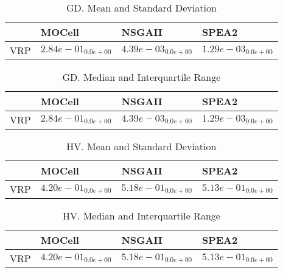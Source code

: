 \documentclass{article}
\begin{document}
\begin{table}
\caption{GD. Mean and Standard Deviation}
\label{table: GD}
\centering
\begin{scriptsize}
\begin{tabular}{llll}
\hline & MOCell & NSGAII &  SPEA2\\
\hline 
VRP & $  2.84e-01_{ 0.0e+00}$ & \cellcolor{gray25}$  4.39e-03_{ 0.0e+00}$ & \cellcolor{gray95}$  1.29e-03_{ 0.0e+00}$ \\
\hline
\end{tabular}
\end{scriptsize}
\end{table}

\begin{table}
\caption{GD. Median and Interquartile Range}
\label{table: GD}
\centering
\begin{scriptsize}
\begin{tabular}{llll}
\hline & MOCell & NSGAII &  SPEA2\\
\hline 
VRP & $  2.84e-01_{ 0.0e+00}$ & \cellcolor{gray25}$  4.39e-03_{ 0.0e+00}$ & \cellcolor{gray95}$  1.29e-03_{ 0.0e+00}$ \\
\hline
\end{tabular}
\end{scriptsize}
\end{table}

\begin{table}
\caption{HV. Mean and Standard Deviation}
\label{table: HV}
\centering
\begin{scriptsize}
\begin{tabular}{llll}
\hline & MOCell & NSGAII &  SPEA2\\
\hline 
VRP & $  4.20e-01_{ 0.0e+00}$ & \cellcolor{gray95}$  5.18e-01_{ 0.0e+00}$ & \cellcolor{gray25}$  5.13e-01_{ 0.0e+00}$ \\
\hline
\end{tabular}
\end{scriptsize}
\end{table}

\begin{table}
\caption{HV. Median and Interquartile Range}
\label{table: HV}
\centering
\begin{scriptsize}
\begin{tabular}{llll}
\hline & MOCell & NSGAII &  SPEA2\\
\hline 
VRP & $  4.20e-01_{ 0.0e+00}$ & \cellcolor{gray95}$  5.18e-01_{ 0.0e+00}$ & \cellcolor{gray25}$  5.13e-01_{ 0.0e+00}$ \\
\hline
\end{tabular}
\end{scriptsize}
\end{table}
\end{document}
